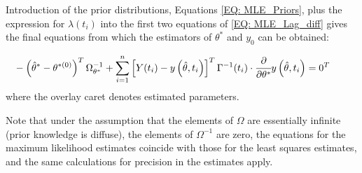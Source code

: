 \documentclass[a4paper,fleqn]{cas-dc}
\begin{document}
Introduction of the prior distributions, Equations \ref{EQ: MLE_Priors}, plus the expression for $\lambda(t_i)$ into the first two equations of \ref{EQ: MLE_Lag_diff} gives the final equations from which the estimators of $\theta^*$ and $y_0$ can be obtained:

{\footnotesize
	\begin{subequations} 
		\begin{flalign}
			&-\left( \hat{\theta}^* - \theta^{*(0)} \right)^T \Omega_{\theta^*}^{-1} + \sum_{i=1}^{n}\left[ Y(t_i) - y\left( \hat{\theta}, t_i \right) \right]^T \Gamma^{-1}(t_i) \cdot \cfrac{\partial}{\partial \theta^*} y\left( \hat{\theta}, t_i \right) = 0^T &&
		\end{flalign}
\end{subequations} }
where the overlay caret denotes estimated parameters.

Note that under the assumption that the elements of $\Omega$ are essentially infinite (prior knowledge is diffuse), the elements of $\Omega^{-1}$ are zero, the equations for the maximum likelihood estimates coincide with those for the least squares estimates, and the same calculations for precision in the estimates apply.
\end{document}
